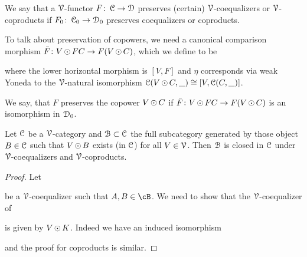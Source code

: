 \documentclass[a4paper,11pt,oneside,openany]{scrbook}
\begin{document}
\begin{defn}
	We say that a $\V$-functor $F \from \C \to \D$ preserves (certain) $\V$-coequalizers or $\V$-coproducts if $F_{0} \from \C_{0} \to \D_{0}$ preserves
	coequalizers or coproducts.
\end{defn}

To talk about preservation of copowers, we need a canonical comparison morphism $\bar{F} \from V\copw FC \to F(V\copw C)$, which we define to be
\begin{center}
\end{center}
where the lower horizontal morphism is $[V,F]$ and $\eta$ corresponds via weak Yoneda to the $\V$-natural isomorphism $\C(V\copw C,\_) \iso [V,\C(C,\_)]$.

\begin{defn}
	We say, that $F$ preserves the copower $V \copw C$ if $\bar{F} \from V \copw FC \to F(V \copw C)$ is an isomorphism in $\D_{0}$.
\end{defn}

\begin{lemma}
	Let $\C$ be a $\V$-category and $\B \subset \C$ the full subcategory
    generated by those object $B \in \C$ such that $V \copw B$ exists (in $\C$)
    for all $V \in \V$. Then $\B$ is closed in $\C$ under $\V$-coequalizers and
    $\V$-coproducts.
\end{lemma}

\begin{proof}
	Let
	\begin{center}
	\end{center}
	be a $\V$-coequalizer such that $A,B\in\cB$. We need to show that the
    $\V$-coequalizer of
	\begin{center}
	\end{center}
	is given by $V \copw K$. Indeed we have an induced isomorphism
	\begin{center}
	\end{center}
	and the proof for coproducts is similar.
\end{proof}
\end{document}
